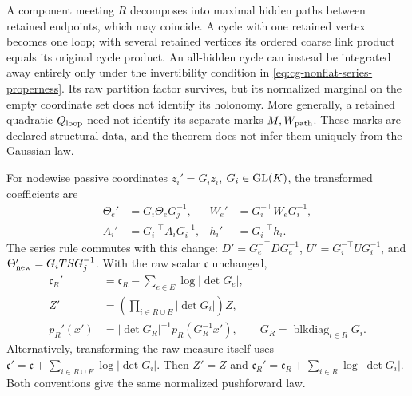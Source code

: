 A component meeting \(R\) decomposes into maximal hidden paths
between retained endpoints, which may coincide. A cycle with one
retained vertex becomes one loop; with several retained vertices
its ordered coarse link product equals its original cycle product.
An all-hidden cycle can instead be integrated away entirely only
under the invertibility condition in
\eqref{eq:cg-nonflat-series-properness}. Its raw partition factor
survives, but its normalized marginal on the empty coordinate set
does not identify its holonomy. More generally, a retained
quadratic \(Q_{\rm loop}\) need not identify its separate marks
\(M,W_{\rm path}\). These marks are declared structural data,
and the theorem does not infer them uniquely from the Gaussian
law. 

For nodewise passive coordinates \(z_i'=G_i z_i\),
\(G_i\in\mathrm{GL}(K)\), the transformed coefficients are
\begin{equation}
\begin{aligned}
\Theta_e'&=G_i\Theta_eG_j^{-1},&
W_e'&=G_i^{-\top}W_eG_i^{-1},\\
A_i'&=G_i^{-\top}A_iG_i^{-1},&
h_i'&=G_i^{-\top}h_i.
\end{aligned}
\label{eq:cg-nonflat-series-gauge-law}
\end{equation}
The series rule commutes with this change:
\(D'=G_e^{-\top}DG_e^{-1}\),
\(U'=G_i^{-\top}UG_i^{-1}\), and
\(\Theta_{\rm new}'=G_iTSG_j^{-1}\).
With the raw scalar \(\mathfrak c\) unchanged,
\begin{equation}
\begin{aligned}
\mathfrak c_R'
 &=\mathfrak c_R-\sum_{e\in E}\log|\det G_e|,\\
Z'&=\left(\prod_{i\in R\cup E}|\det G_i|\right)Z,\\
p_R'(x')&=|\det G_R|^{-1}p_R(G_R^{-1}x'),
\qquad G_R=\operatorname{blkdiag}_{i\in R}G_i.
\end{aligned}
\label{eq:cg-nonflat-series-jacobians}
\end{equation}
Alternatively, transforming the raw measure itself uses
\(\mathfrak c'=\mathfrak c+\sum_{i\in R\cup E}\log|\det G_i|\).
Then \(Z'=Z\) and
\(\mathfrak c_R'=\mathfrak c_R+\sum_{i\in R}\log|\det G_i|\).
Both conventions give the same normalized pushforward law.

